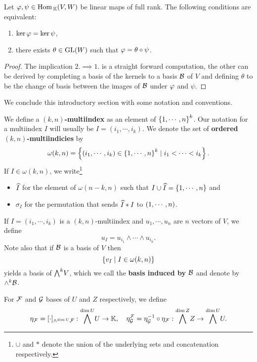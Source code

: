 \begin{lemma}\label{kerAkerBVSActionOfGLk}
Let $\varphi,\psi\in \mathrm{Hom}\,_{\mathbb{K}}(V,W)$ be linear maps of full rank. The following conditions are equivalent:
\begin{enumerate}
    \item $\ker\varphi=\ker\psi$,
    \item there exists $\theta\in \mathrm{GL}(W)$ such that $\varphi=\theta\circ \psi$. 
\end{enumerate}
\end{lemma}
\begin{proof}
The implication $2.\implies 1.$ is a straight forward computation, the other can be derived by completing a basis of the kernels to a basis $\mathcal{B}$ of $V$ and defining $\theta$ to be the change of basis between the images of $\mathcal{B}$ under $\varphi$ and $\psi$.
\end{proof}

\noindent We conclude this introductory section with some notation and conventions.
\begin{definition}[Multiindicies]
We define a \textbf{$(k,n)$-multiindex} as an element of $\left\{{1,\cdots, n}\right\}^k$. Our notation for a multiindex $I$ will usually be $I=(i_1,\cdots, i_k)$. We denote the set of \textbf{ordered $(k,n)$-multiindicies} by
\[\omega(k,n)=\left\{{(i_1,\cdots, i_k)\in \left\{{1,\cdots, n}\right\}^k\mid i_1<\cdots<i_k}\right\}.\]
If $I\in \omega(k,n)$, we write\footnote{$\cup$ and $\ast$ denote the union of the underlying sets and concatenation respectively.}
\begin{itemize}
\item $\widehat{I}$ for the element of $\omega(n-k,n)$ such that $I\cup \widehat{I}=\left\{{1,\cdots, n}\right\}$ and 
\item $\sigma_I$ for the permutation that sends $\widehat{I}\ast I$ to $\left({1,\cdots, n}\right)$.
\end{itemize}
\end{definition}

\begin{remark}
If $I=(i_1,\cdots, i_k)$ is a $(k,n)$-multiindex and $u_1,\cdots, u_n$ are $n$ vectors of $V$, we define
\[u_I=u_{i_1}\wedge\cdots\wedge u_{i_k}.\]
Note also that if $\mathcal{B}$ is a basis of $V$ then
\[\left\{{v_I\mid I\in \omega(k,n)}\right\}\]
yields a basis of $\bw V$, which we call the \textbf{basis induced by $\mathcal{B}$} and denote by $\wedge^k\mathcal{B}$.
\end{remark}

\begin{notation}
For $\mathcal{F}$ and $\mathcal{G}$ bases of $U$ and $Z$ respectively, we define
\[\eta_\Fc=[\cdot]_{\wedge^{\dim U}\Fc}:\bw[\dim U]U\to \K,\quad \eta^\Fc_\Gc=\eta_\Gc\ii\circ \eta_\Fc:\bw[\dim Z]Z\to\bw[\dim U]U.\]
\end{notation}



